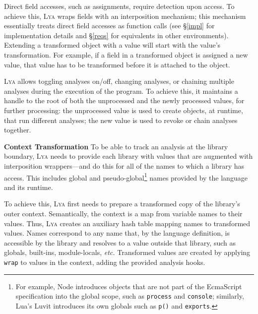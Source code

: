 \documentclass[letterpaper,twocolumn,10pt]{article}
\def\etc{{\em etc.}\xspace}
\newcommand{\heading}[1]{\vspace{2pt}\noindent\textbf{#1}\enspace}
\newcommand{\ttt}[1]{\texttt{#1}}
\newcommand{\ttiny}[1]{\texttt{\footnotesize #1}}
\newcommand{\sys}{{\scshape Lya}\xspace}
\begin{document}
Direct field accesses, such as assignments, require detection upon access.
To achieve this, \sys wraps fields with an interposition mechanism;
  this mechanism essentially treats direct field accesses as function calls (see \S\ref{impl} for implementation details and \S\ref{reqs} for equivalents in other environments).
Extending a transformed object with a value will start with the value's transformation.
For example, if a field in a transformed object is assigned a new value, that value has to be transformed before it is attached to the object.

\sys allows toggling analyses on/off, changing analyses, or chaining multiple analyses during the execution of the program.
To achieve this, it maintains a handle to the root of both the unprocessed and the newly processed values, for further processing:
  the unprocessed value is used to create objects, at runtime, that run different analyses;
  the new value is used to revoke or chain analyses together.

\heading{Context Transformation}
To be able to track an analysis at the library boundary, \sys needs to provide each library with values that are augmented with interposition wrappers---and do this for all of the names to which a library has access.
This includes global and pseudo-global\footnote{
  For example, Node introduces objects that are not part of the EcmaScript specification into the global scope, such as \ttiny{process} and \ttiny{console};
  similarly, Lua's Luvit introduces its own globals such as \ttiny{p()} and \ttiny{exports}.
} names provided by the language and its runtime.

To achieve this, \sys first needs to prepare a transformed copy of the library's outer context.
Semantically, the context is a map from variable names to their values.
Thus, \sys creates an auxiliary hash table mapping names to transformed values.
Names correspond to any name that, by the language definition, is accessible by the library and resolves to a value outside that library, such as globals, built-ins, module-locals, \etc
Transformed values are created by applying \ttt{wrap} to values in the context, adding the provided analysis hooks.

\end{document}
